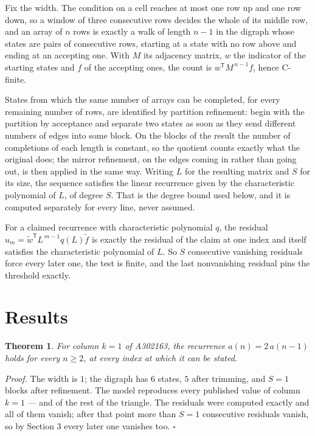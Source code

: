 \documentclass[11pt]{article}
\newtheorem{theorem}{Theorem}
\theoremstyle{definition}
\begin{document}
Fix the width. The condition on a cell reaches at most one row up and one row down, so a window of three consecutive rows decides the whole of its middle row, and an array of $n$ rows is exactly a walk of length $n-1$ in the digraph whose states are pairs of consecutive rows, starting at a state with no row above and ending at an accepting one. With $M$ its adjacency matrix, $w$ the indicator of the starting states and $f$ of the accepting ones, the count is $w^{\mathsf T}M^{\,n-1}f$, hence C-finite.

States from which the same number of arrays can be completed, for every remaining number of rows, are identified by partition refinement: begin with the partition by acceptance and separate two states as soon as they send different numbers of edges into some block. On the blocks of the result the number of completions of each length is constant, so the quotient counts exactly what the original does; the mirror refinement, on the edges coming in rather than going out, is then applied in the same way. Writing $L$ for the resulting matrix and $S$ for its size, the sequence satisfies the linear recurrence given by the characteristic polynomial of $L$, of degree $S$. That is the degree bound used below, and it is computed separately for every line, never assumed.

For a claimed recurrence with characteristic polynomial $q$, the residual $u_m = \tilde w^{\mathsf T}L^{\,m-1}q(L)\tilde f$ is exactly the residual of the claim at one index and itself satisfies the characteristic polynomial of $L$. So $S$ consecutive vanishing residuals force every later one, the test is finite, and the last nonvanishing residual pins the threshold exactly.

\section{Results}

\begin{theorem} For column $k = 1$ of A302163, the recurrence $a(n) = 2\,a(n-1)$ holds for every $n \ge 2$, at every index at which it can be stated.\end{theorem}

{\itshape Proof.} The width is $1$; the digraph has $6$ states, $5$ after trimming, and $S = 1$ blocks after refinement. The model reproduces every published value of column $k = 1$ --- and of the rest of the triangle. The residuals were computed exactly and all of them vanish; after that point more than $S = 1$ consecutive residuals vanish, so by Section 3 every later one vanishes too. $\square$
\end{document}
